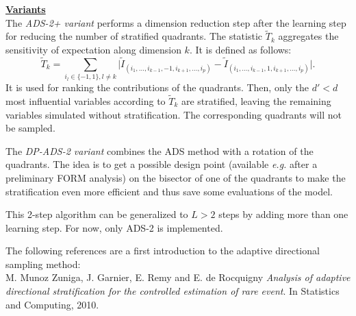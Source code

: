 {\underline{\textbf{Variants}}\\

The \emph{ADS-2+ variant} performs a dimension reduction step after the learning step for reducing the number of stratified quadrants. The statistic $\tilde T_k$ aggregates the sensitivity of expectation along dimension $k$. It is defined as follows:
\begin{equation}
  \tilde T_k = \sum\limits_{i_l \in \lbrace -1,1 \rbrace,l \neq k} \lvert \tilde I_{(i_1,\dots,i_{k-1},-1,i_{k+1},\dots,i_p)} - \tilde I_{(i_1,\dots,i_{k-1},1,i_{k+1},\dots,i_p)} \rvert.
\end{equation}
It is used for ranking the contributions of the quadrants. Then, only the $d' < d$ most influential variables according to $\tilde T_k$ are stratified, leaving the remaining variables simulated without stratification. The corresponding quadrants will not be sampled.\par

The \emph{DP-ADS-2 variant} combines the ADS method with a rotation of the quadrants. The idea is to get a possible design point (available \emph{e.g.} after a preliminary FORM analysis) on the bisector of one of the quadrants to make the stratification even more efficient and thus save some evaluations of the model.\par
}
{
This 2-step algorithm can be generalized to $L > 2$ steps by adding more than one learning step. For now, only ADS-2 is implemented.\par
}

{
\vspace{10mm}
The following references are a first introduction to the adaptive directional sampling method:\\

\label{mg10} M. Munoz Zuniga, J. Garnier, E. Remy and E. de Rocquigny \textit{Analysis of adaptive directional stratification for the controlled estimation of rare event}. In Statistics and Computing, 2010.
}
